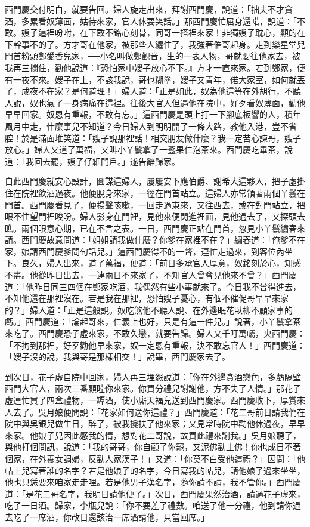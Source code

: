西門慶交付明白，就要告回。婦人旋走出來，拜謝西門慶，說道：「拙夫不才貪酒，多累看奴薄面，姑待來家，官人休要笑話。」那西門慶忙屈身還喏，說道：「不敢。嫂子這裡吩咐，在下敢不銘心刻骨，同哥一搭裡來家！非獨嫂子耽心，顯的在下幹事不的了。方才哥在他家，被那些人纏住了，我強著催哥起身。走到樂星堂兒門首粉頭鄭愛香兒家，──小名叫做鄭觀音，生的一表人物，哥就要往他家去，被我再三攔住，勸他說道：『恐怕家中嫂子放心不下。』方才一直來家。若到鄭家，便有一夜不來。嫂子在上，不該我說，哥也糊塗，嫂子又青年，偌大家室，如何就丟了，成夜不在家？是何道理！」婦人道：「正是如此，奴為他這等在外胡行，不聽人說，奴也氣了一身病痛在這裡。往後大官人但遇他在院中，好歹看奴薄面，勸他早早回家。奴恩有重報，不敢有忘。」這西門慶是頭上打一下腳底板響的人，積年風月中走，什麼事兒不知道？今日婦人到明明開了一條大路，教他入港，豈不省腔！於是滿面堆笑道：「嫂子說那裡話！相交朋友做什麼？我一定苦心諫哥，嫂子放心。」婦人又道了萬福，又叫小丫鬟拿了一盞果仁泡茶來。西門慶吃畢茶，說道：「我回去罷，嫂子仔細門戶。」遂告辭歸家。

自此西門慶就安心設計，圖謀這婦人，屢屢安下應伯爵、謝希大這夥人，把子虛掛住在院裡飲酒過夜。他便脫身來家，一徑在門首站立。這婦人亦常領著兩個丫鬟在門首。西門慶看見了，便揚聲咳嗽，一回走過東來，又往西去，或在對門站立，把眼不住望門裡睃盼。婦人影身在門裡，見他來便閃進裡面，見他過去了，又探頭去瞧。兩個眼意心期，已在不言之表。一日，西門慶正站在門首，忽見小丫鬟繡春來請。西門慶故意問道：「姐姐請我做什麼？你爹在家裡不在？」繡春道：「俺爹不在家，娘請西門慶爹問句話兒。」這西門慶得不的一聲，連忙走過來，到客位內坐下。良久，婦人出來，道了萬福，便道：「前日多承官人厚意，奴銘刻於心，知感不盡。他從昨日出去，一連兩日不來家了，不知官人曾會見他來不曾？」西門慶道：「他昨日同三四個在鄭家吃酒，我偶然有些小事就來了。今日我不曾得進去，不知他還在那裡沒在。若是我在那裡，恐怕嫂子憂心，有個不催促哥早早來家的？」婦人道：「正是這般說。奴吃煞他不聽人說、在外邊眠花臥柳不顧家事的虧。」西門慶道：「論起哥來，仁義上也好，只是有這一件兒。」說著，小丫鬟拿茶來吃了。西門慶恐子虛來家，不敢久戀，就要告歸。婦人又千叮萬囑，央西門慶：「不拘到那裡，好歹勸他早來家，奴一定恩有重報，決不敢忘官人！」西門慶道：「嫂子沒的說，我與哥是那樣相交！」說畢，西門慶家去了。

到次日，花子虛自院中回家，婦人再三埋怨說道：「你在外邊貪酒戀色，多虧隔壁西門大官人，兩次三番顧睦你來家。你買分禮兒謝謝他，方不失了人情。」那花子虛連忙買了四盒禮物，一罈酒，使小廝天福兒送到西門慶家。西門慶收下，厚賞來人去了。吳月娘便問說：「花家如何送你這禮？」西門慶道：「花二哥前日請我們在院中與吳銀兒做生日，醉了，被我攙扶了他來家；又見常時院中勸他休過夜，早早來家。他娘子兒因此感我的情，想對花二哥說，故買此禮來謝我。」吳月娘聽了，與他打個問訊，說道：「我的哥哥，你自顧了你罷，又泥佛勸土佛！你也成日不著個家，在外養女調婦，反勸人家漢子！」又道：「你莫不白受他這禮？」因問：「他帖上兒寫著誰的名字？若是他娘子的名字，今日寫我的帖兒，請他娘子過來坐坐，他也只恁要來咱家走走哩。若是他男子漢名字，隨你請不請，我不管你。」西門慶道：「是花二哥名字，我明日請他便了。」次日，西門慶果然治酒，請過花子虛來，吃了一日酒。歸家，李瓶兒說：「你不要差了禮數。咱送了他一分禮，他到請你過去吃了一席酒，你改日還該治一席酒請他，只當回席。」

